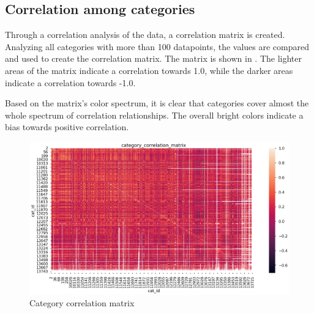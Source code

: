 \subsection{Correlation among categories}
Through a correlation analysis of the data, a correlation matrix is created.
Analyzing all categories with more than 100 datapoints, the values are compared and used to create the correlation matrix.
The matrix is shown in .
The lighter areas of the matrix indicate a correlation towards 1.0, while the darker areas indicate a correlation towards -1.0.

Based on the matrix's color spectrum, it is clear that categories cover almost the whole spectrum of correlation relationships.
The overall bright colors indicate a bias towards positive correlation.

\begin{figure}[h!]
  \centering
  \includegraphics[width=\textwidth]{./figs/code_generated/data_exploration/category_correlation_matrix.png}
  \hfill
  \caption{Category correlation matrix}
  \label{fig:category_corelation_matrix}
\end{figure}





